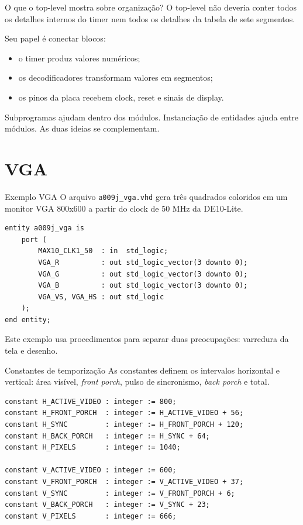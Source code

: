 \documentclass[aspectratio=169,11pt]{beamer}
\begin{document}
\begin{frame}{O que o top-level mostra sobre organização?}
    O top-level não deveria conter todos os detalhes internos do timer nem todos os detalhes da tabela de sete segmentos.

    \vspace{0.5em}
    Seu papel é conectar blocos:
    \begin{itemize}
        \item o timer produz valores numéricos;
        \item os decodificadores transformam valores em segmentos;
        \item os pinos da placa recebem clock, reset e sinais de display.
    \end{itemize}

    \vspace{0.5em}
    Subprogramas ajudam dentro dos módulos. Instanciação de entidades ajuda entre módulos. As duas ideias se complementam.
\end{frame}

\section{VGA}

\begin{frame}[fragile]{Exemplo VGA}
    O arquivo \texttt{a009j\_vga.vhd} gera três quadrados coloridos em um monitor VGA 800x600 a partir do clock de 50 MHz da DE10-Lite.

\begin{lstlisting}
entity a009j_vga is
    port (
        MAX10_CLK1_50  : in  std_logic;
        VGA_R          : out std_logic_vector(3 downto 0);
        VGA_G          : out std_logic_vector(3 downto 0);
        VGA_B          : out std_logic_vector(3 downto 0);
        VGA_VS, VGA_HS : out std_logic
    );
end entity;
\end{lstlisting}

    \vspace{0.3em}
    Este exemplo usa procedimentos para separar duas preocupações: varredura da tela e desenho.
\end{frame}

\begin{frame}[fragile]{Constantes de temporização}
    As constantes definem os intervalos horizontal e vertical: área visível, \textit{front porch}, pulso de sincronismo, \textit{back porch} e total.

\begin{lstlisting}
constant H_ACTIVE_VIDEO : integer := 800;
constant H_FRONT_PORCH  : integer := H_ACTIVE_VIDEO + 56;
constant H_SYNC         : integer := H_FRONT_PORCH + 120;
constant H_BACK_PORCH   : integer := H_SYNC + 64;
constant H_PIXELS       : integer := 1040;

constant V_ACTIVE_VIDEO : integer := 600;
constant V_FRONT_PORCH  : integer := V_ACTIVE_VIDEO + 37;
constant V_SYNC         : integer := V_FRONT_PORCH + 6;
constant V_BACK_PORCH   : integer := V_SYNC + 23;
constant V_PIXELS       : integer := 666;
\end{lstlisting}
\end{frame}
\end{document}
